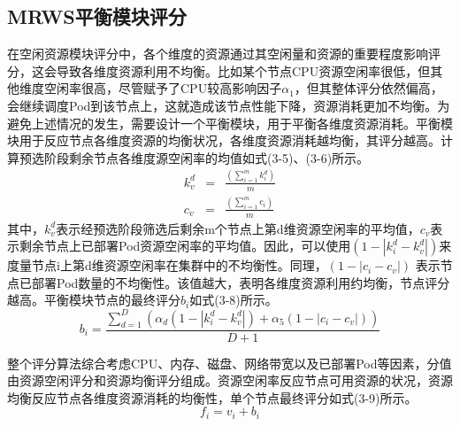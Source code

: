 \subsection{MRWS平衡模块评分}
在空闲资源模块评分中，各个维度的资源通过其空闲量和资源的重要程度影响评分，这会导致各维度资源利用不均衡。比如某个节点CPU资源空闲率很低，但其他维度空闲率很高，尽管赋予了CPU较高影响因子\begin{math}\alpha_{1}\end{math}，但其整体评分依然偏高，会继续调度Pod到该节点上，这就造成该节点性能下降，资源消耗更加不均衡。为避免上述情况的发生，需要设计一个平衡模块，用于平衡各维度资源消耗。平衡模块用于反应节点各维度资源的均衡状况，各维度资源消耗越均衡，其评分越高。计算预选阶段剩余节点各维度源空闲率的均值如式(3-5)、(3-6)所示。
\begin{eqnarray}
k_{v}^{d} &=& \frac{(\sum_{i=1}^{m}k_{i}^{d})}{m} \\[0.3cm]
c_{v} &=& \frac{(\sum_{i=1}^{m}c_{i})}{m}
\end{eqnarray}
其中，\begin{math}k_{v}^{d}\end{math}表示经预选阶段筛选后剩余m个节点上第d维资源空闲率的平均值，\begin{math}c_{v}\end{math}表示剩余节点上已部署Pod资源空闲率的平均值。因此，可以使用\begin{math}(1-\left |k_{i}^{d}-k_{v}^{d}\right |)\end{math}来度量节点i上第d维资源空闲率在集群中的不均衡性。同理，\begin{math}(1-\left |c_{i}-c_{v}\right|)\end{math}
表示节点已部署Pod数量的不均衡性。该值越大，表明各维度资源利用约均衡，节点评分越高。平衡模块节点的最终评分\begin{math}b_{i}\end{math}如式(3-8)所示。
\begin{equation}
b_{i} = \frac{\sum_{d=1}^{D}(\alpha_{d}(1-\left |k_{i}^{d}-k_{v}^{d}\right|)+\alpha_{5}(1-\left |c_{i}-c_{v}\right|))}{D+1}
\end{equation}

整个评分算法综合考虑CPU、内存、磁盘、网络带宽以及已部署Pod等因素，分值由资源空闲评分和资源均衡评分组成。资源空闲率反应节点可用资源的状况，资源均衡反应节点各维度资源消耗的均衡性，单个节点最终评分如式(3-9)所示。
\begin{equation}
f_{i} = v_{i}+b_{i}
\end{equation}

